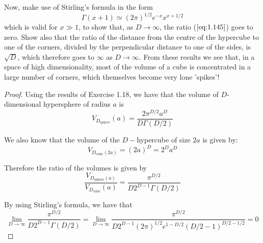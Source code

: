 Now, make use of Stirling's formula in the form
\begin{equation}\label{eq:1.145}\tag{1.145}
    \Gamma(x + 1) \simeq (2\pi)^{1/2} e^{-x} x^{x + 1/2}
\end{equation}
which is valid for $x \gg 1$, to show that, as $D \to \infty$, the
ratio ($\ref{eq:1.145}$) goes to zero. Show also that the ratio
of the distance from the centre of the hypercube to one
of the corners, divided by the perpendicular distance to one of the
sides, is $\sqrt{D}$, which therefore goes to $\infty$ as $D \to \infty$.
From these results we see that, in a space of high dimensionality,
most of the volume of a cube is concentrated in a large number
of corners, which themselves become very lone 'spikes'!

\vspace{1em}

\begin{proof}
    Using the results of Exercise 1.18, we have that the volume of 
    $D$-dimensional hypersphere of radius $a$ is 
    \[
        V_{D_{\text{sphere}}}(a) = \frac{2\pi^{D/2} a^D}{D\Gamma(D/2)}
    \] 

    We also know that the volume of the $D-$hypercube of size $2a$ 
    is given by:
    \[
        V_{D_{\text{cube}}(2a)} = (2a)^D = 2^D a^D
    \] 

    Therefore the ratio of the volumes is given by
    \begin{equation}\tag{1.145}
        \frac{V_{D_{\text{sphere}}(a)}}{V_{D_{\text{cube}}}(a)} = \frac{\pi^{D/2}}{D 2^{D - 1}\Gamma(D/2)}
    \end{equation}

    By using Stirling's formula, we have that
    \[
        \lim_{D \to \infty} \frac{\pi^{D/2}}{D 2^{D - 1}\Gamma(D/2)}
    = \lim_{D \to \infty} \frac{\pi^{D/2}}{D 2^{D - 1} (2\pi)^{1/2}e^{1 - D/2} (D/2 - 1)^{D/2 - 1/2}} = 0
    \] 
\end{proof}
